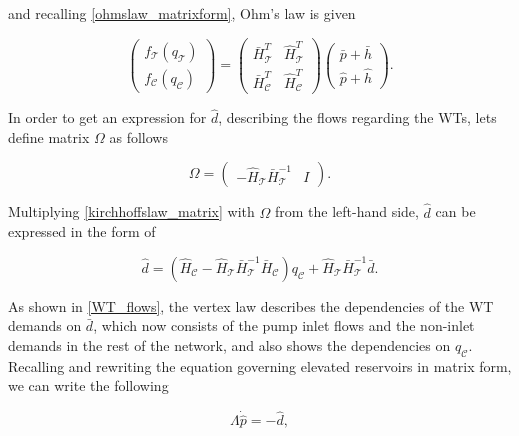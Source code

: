and recalling \eqref{ohmslaw_matrixform}, Ohm's law is given

\begin{equation}
\label{ohmslaw_matrixform}
 \begin{pmatrix} 
 f_{\mathcal{T}}(q_\mathcal{T}) \\[3pt]
 f_{\mathcal{C}}(q_\mathcal{C}) 
 \end{pmatrix}
 =
 \begin{pmatrix}
   \bar{H}^T_{\mathcal{T}} & \hat{H}^T_{\mathcal{T}} \\[3pt]
   \bar{H}^T_{\mathcal{C}} & \hat{H}^T_{\mathcal{C}} 
   \end{pmatrix}
   \begin{pmatrix} 
 \bar{p} + \bar{h} \\[3pt] 
 \hat{p} + \hat{h} 
 \end{pmatrix}.
\end{equation}

In order to get an expression for $\hat{d}$, describing the flows regarding the WTs, lets define matrix $\Omega$ as follows

\begin{equation}
\label{omega_matrix}
\Omega
=
\begin{pmatrix} 
 -\hat{H}_{\mathcal{T}}  \bar{H}^{-1}_{\mathcal{T}}  & I  
 \end{pmatrix}.
\end{equation}

Multiplying \eqref{kirchhoffslaw_matrix} with $\Omega$ from the left-hand side, $\hat{d}$ can be expressed in the form of

\begin{equation}
\label{WT_flows}
\hat{d} = (\hat{H}_{\mathcal{C}} - \hat{H}_{\mathcal{T}} \bar{H}^{-1}_{\mathcal{T}}\bar{H}_{\mathcal{C}})  q_\mathcal{C}  + \hat{H}_{\mathcal{T}} \bar{H}^{-1}_{\mathcal{T}} \bar{d}.
\end{equation}

As shown in \eqref{WT_flows}, the vertex law describes the dependencies of the WT demands on $\bar{d}$, which now consists of the pump inlet flows and the non-inlet demands in the rest of the network, and also shows the dependencies on $q_\mathcal{C}$. Recalling and rewriting the equation governing elevated reservoirs in matrix form, we can write the following

\begin{equation}
\label{WT_matrixform}
\Lambda \dot{\hat{p}} = - \hat{d},
\end{equation}

